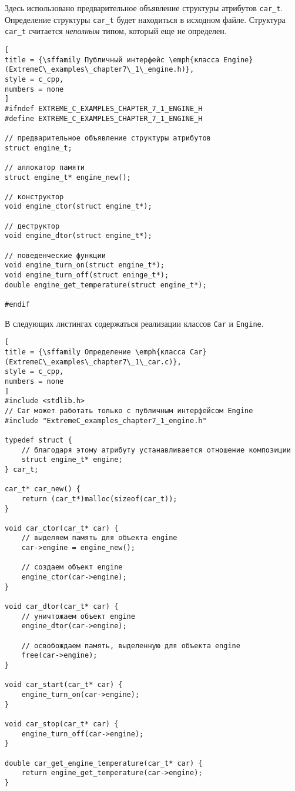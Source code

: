 \documentclass[%
	11pt,
	a4paper,
	utf8,
		]{article}
\begin{document}
Здесь использовано предварительное объявление структуры атрибутов \verb|car_t|. Определение структуры \verb|car_t| будет находиться в исходном файле. Структура \verb|car_t| считается \emph{неполным} типом, который еще не определен.

\begin{lstlisting}[
title = {\sffamily Публичный интерфейс \emph{класса Engine} (ExtremeC\_examples\_chapter7\_1\_engine.h)},
style = c_cpp,
numbers = none
]
#ifndef EXTREME_C_EXAMPLES_CHAPTER_7_1_ENGINE_H
#define EXTREME_C_EXAMPLES_CHAPTER_7_1_ENGINE_H

// предварительное объявление структуры атрибутов
struct engine_t;

// аллокатор памяти
struct engine_t* engine_new();

// конструктор
void engine_ctor(struct engine_t*);

// деструктор
void engine_dtor(struct engine_t*);

// поведенческие функции
void engine_turn_on(struct engine_t*);
void engine_turn_off(struct eninge_t*);
double engine_get_temperature(struct engine_t*);

#endif
\end{lstlisting}

В следующих листингах содержаться реализации классов \verb|Car| и \verb|Engine|.
\begin{lstlisting}[
title = {\sffamily Определение \emph{класса Car} (ExtremeC\_examples\_chapter7\_1\_car.c)},
style = c_cpp,
numbers = none
]
#include <stdlib.h>
// Car может работать только с публичным интерфейсом Engine
#include "ExtremeC_examples_chapter7_1_engine.h"

typedef struct {
    // благодаря этому атрибуту устанавливается отношение композиции
    struct engine_t* engine;
} car_t;

car_t* car_new() {
    return (car_t*)malloc(sizeof(car_t));
}

void car_ctor(car_t* car) {
    // выделяем память для объекта engine
    car->engine = engine_new();
    
    // создаем объект engine
    engine_ctor(car->engine);
}

void car_dtor(car_t* car) {
    // уничтожаем объект engine
    engine_dtor(car->engine);
    
    // освобождаем память, выделенную для объекта engine
    free(car->engine);
}

void car_start(car_t* car) {
    engine_turn_on(car->engine);
}

void car_stop(car_t* car) {
    engine_turn_off(car->engine);
}

double car_get_engine_temperature(car_t* car) {
    return engine_get_temperature(car->engine);
}
\end{lstlisting}
\end{document}
